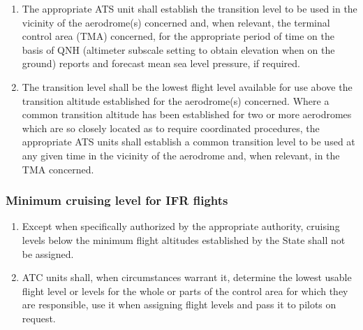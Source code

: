 \documentclass[../vATM.tex]{subfiles}
\begin{document}
    \begin{enumerate}
        \item The appropriate ATS unit shall establish the transition level to be used in the vicinity of the aerodrome(s) concerned and, when relevant, the terminal control area (TMA) concerned, for the appropriate period of time on the basis of QNH (altimeter subscale setting to obtain elevation when on the ground) reports and forecast mean sea level pressure, if required.
        \item The transition level shall be the lowest flight level available for use above the transition altitude established for the aerodrome(s) concerned. Where a common transition altitude has been established for two or more aerodromes which are so closely located as to require coordinated procedures, the appropriate ATS units shall establish a common transition level to be used at any given time in the vicinity of the aerodrome and, when relevant, in the TMA concerned.
    \end{enumerate}

    \subsubsection{Minimum cruising level for IFR flights}

    \begin{enumerate}
        \item Except when specifically authorized by the appropriate authority, cruising levels below the minimum flight altitudes established by the State shall not be assigned.
        \item \label{4.10.3.2} ATC units shall, when circumstances warrant it, determine the lowest usable flight level or levels for the whole or parts of the control area for which they are responsible, use it when assigning flight levels and pass it to pilots on request.
    \end{enumerate}
\end{document}
